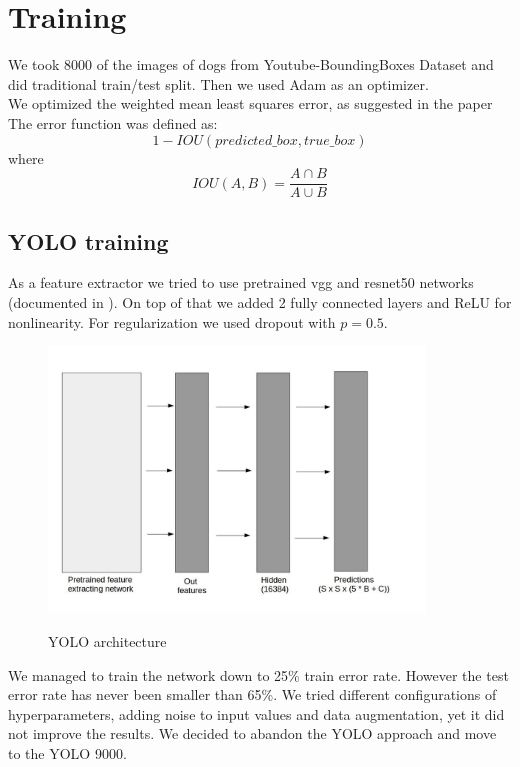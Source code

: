 \documentclass{article}
\begin{document}
\section*{Training}

We took 8000 of the images of dogs from Youtube-BoundingBoxes Dataset and did traditional train/test split. Then we used Adam as an optimizer. \\

We optimized the weighted mean least squares error, as suggested in the paper \cite{yolo} \\

The error function was defined as:
$$ 1 - IOU(predicted\_box, true\_box)$$
where
$$ IOU(A, B) = \frac{ A \cap B}{A \cup B} $$

\subsection*{YOLO training}
As a feature extractor we tried to use pretrained vgg and resnet50 networks (documented in \cite{models}). On top of that we added 2 fully connected layers and ReLU for nonlinearity. For regularization we used dropout with $p = 0.5$. 

\begin{figure}[H]
	\begin{center}
		\includegraphics[width=10cm]{yolo_arch.jpg}\\
		\centering
		\caption{YOLO architecture}
	\end{center}
\hfill

\end{figure}

We managed to train the network down to 25\% train error rate. However the test error rate has never been smaller than 65\%. We tried different configurations of hyperparameters, adding noise to input values and data augmentation, yet it did not improve the results. We decided to abandon the YOLO approach and move to the YOLO 9000.
\end{document}

